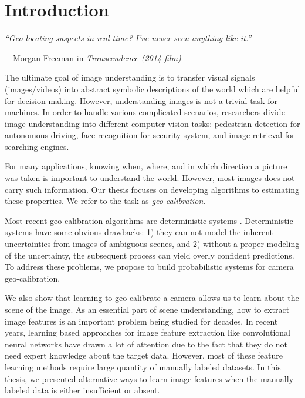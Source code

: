 \chapter{Introduction}
\label{chap:intro}

\makeatletter
\newenvironment{chapquote}[2][2em]
{\setlength{\@tempdima}{#1} \def\chapquote@author{#2} \parshape 1
  \@tempdima \dimexpr\textwidth-2\@tempdima\relax \itshape}
{\par\normalfont\hfill--\
\chapquote@author\hspace*{\@tempdima}\par\bigskip}
\makeatother

\begin{chapquote}{Morgan Freeman in {\em Transcendence (2014 film)}}
  ``Geo-locating suspects in real time? I've never seen anything like
it.''
\end{chapquote}

The ultimate goal of image understanding is to transfer visual
signals (images/videos) into abstract symbolic descriptions of the
world which are helpful for decision making.
However, understanding images is not a trivial task for machines.
In order to handle various complicated scenarios, researchers divide
image understanding into different computer vision tasks: pedestrian
detection for autonomous driving, face recognition for security
system, and image retrieval for searching engines.

For many applications, knowing when, where, and in which direction a
picture was taken is important to understand the world. However, most
images does not carry such information. Our thesis focuses on
developing algorithms to estimating these properties. We
refer to the task as {\em geo-calibration}.

Most recent geo-calibration algorithms are deterministic systems
\todo{citations}. 
Deterministic systems have some obvious drawbacks: 1) they can not
model the inherent uncertainties from images of ambiguous scenes, and
2) without a proper modeling of the uncertainty, the subsequent
process can yield overly confident predictions. To address these
problems, we propose to build probabilistic systems for camera
geo-calibration.

We also show that learning to geo-calibrate a camera allows us to
learn about the scene of the image.
As an essential part of scene understanding, how to extract image
features is an important problem being studied for decades.  In
recent years, learning based approaches for image feature extraction
like convolutional neural networks have drawn a lot of attention due
to the fact that they do not need expert knowledge about the target
data. However, most of these feature learning methods require large
quantity of manually labeled datasets.  In this thesis, we presented
alternative ways to learn image features when the
manually labeled data is either insufficient or absent.

